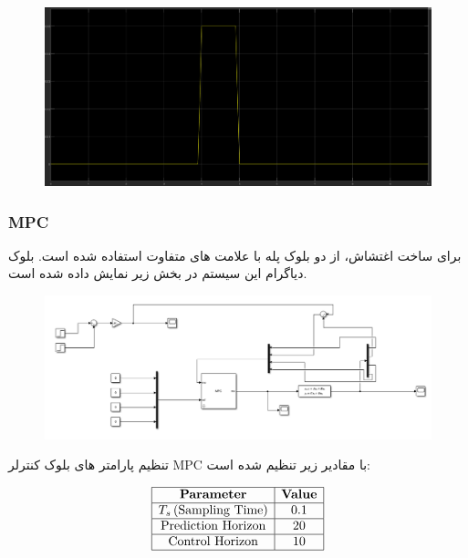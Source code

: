  \begin{figure}
 	\centering
 	\includegraphics[width=1\linewidth]{../img/Q3_Disturbance}
 	\caption{}
 	\label{fig:q3disturbance}
 \end{figure}
 
 \subsubsection{MPC}
 برای ساخت اغتشاش، از دو بلوک پله با علامت های متفاوت استفاده شده است. بلوک دیاگرام این سیستم در بخش زیر نمایش داده شده است.
 
\begin{figure}[H]
	\centering
	\includegraphics[width=1\linewidth]{../img/Q3_MPC_Block}
	\caption{}
	\label{fig:q3mpcblock}
\end{figure}
 
 تنظیم پارامتر های بلوک کنترلر MPC با مقادیر زیر تنظیم شده است:
 
 \[
 \begin{array}{|c|c|}
 	\hline
 	\textbf{Parameter} & \textbf{Value} \\ 
 	\hline
 	T_s \, (\text{Sampling Time}) & 0.1 \\ 
 	\hline
 	\text{Prediction Horizon} & 20 \\ 
 	\hline
 	\text{Control Horizon} & 10 \\ 
 	\hline
 \end{array}
 \]
 
